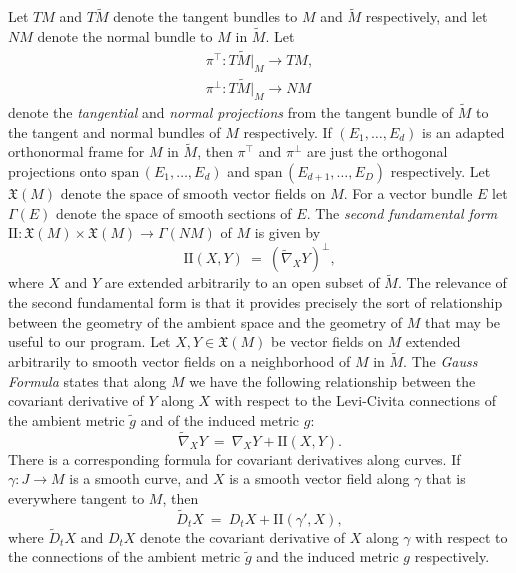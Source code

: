 \documentclass[11pt]{article}
\newcommand{\benn}{\begin{equation*}}
\newcommand{\eenn}{\end{equation*}}
\newcommand{\spn}{\mathrm{span} \,}
\numberwithin{equation}{section}
\begin{document}
Let $TM$ and $T\tilde{M}$ denote the tangent bundles to $M$ and $\tilde{M}$ respectively, and let $NM$ denote the normal bundle to $M$ in $\tilde{M}$. Let
\begin{align*}
	\pi^{\top}: T\tilde{M}|_M \to TM, \\
	\pi^{\perp}: T\tilde{M}|_M \to NM
\end{align*}
denote the \emph{tangential} and \emph{normal projections} from the tangent bundle of $\tilde{M}$ to the tangent and normal bundles of $M$ respectively. If $(E_1, \ldots, E_d)$ is an adapted orthonormal frame for $M$ in $\tilde{M}$, then $\pi^{\top}$ and $\pi^{\perp}$ are just the orthogonal projections onto $\spn(E_1, \ldots, E_d)$ and $\spn(E_{d+1}, \ldots, E_D)$ respectively. Let $\mathfrak{X}(M)$ denote the space of smooth vector fields on $M$. For a vector bundle $E$ let $\Gamma(E)$ denote the space of smooth sections of $E$. The \emph{second fundamental form} $\mathrm{II}: \mathfrak{X}(M) \times \mathfrak{X}(M) \to \Gamma(NM)$ of $M$ is given by
\benn
	\mathrm{II}(X, Y) \ = \ (\tilde{\nabla}_X Y)^{\perp},
\eenn
where $X$ and $Y$ are extended arbitrarily to an open subset of $\tilde{M}$. The relevance of the second fundamental form is that it provides precisely the sort of relationship between the geometry of the ambient space and the geometry of $M$ that may be useful to our program. Let $X, Y \in \mathfrak{X}(M)$ be vector fields on $M$ extended arbitrarily to smooth vector fields on a neighborhood of $M$ in $\tilde{M}$. The \emph{Gauss Formula} states that along $M$ we have the following relationship between the covariant derivative of $Y$ along $X$ with respect to the Levi-Civita connections of the ambient metric $\tilde{g}$ and of the induced metric $g$:
\benn
	\tilde{\nabla}_X Y \ = \ \nabla_X Y + \mathrm{II}(X, Y).
\eenn
There is a corresponding formula for covariant derivatives along curves. If $\gamma: J \to M$ is a smooth curve, and $X$ is a smooth vector field along $\gamma$ that is everywhere tangent to $M$, then
\benn
	\tilde{D}_tX \ = \ D_tX + \mathrm{II}(\gamma', X),
\eenn
where $\tilde{D}_t X$ and $D_t X$ denote the covariant derivative of $X$ along $\gamma$ with respect to the connections of the ambient metric $\tilde{g}$ and the induced metric $g$ respectively.
\end{document}
